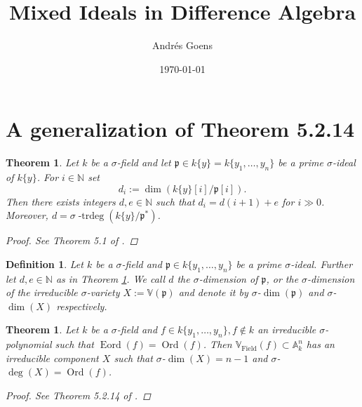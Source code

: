 \documentclass{article}
\title{Mixed Ideals in Difference Algebra}
\author{Andr\'{e}s Goens}
\date{\today}
\def\N{\mathbb{N}}
\def\VV{\mathbb{V}}
\def\p{\mathfrak{p}}
\def\s{\sigma}
\def\dim{\operatorname{dim}}
\newenvironment{bew}{\begin{proof}[Proof]}{\end{proof}}
\theoremstyle{plain}
\newtheorem{theorem}[Satz]{Theorem}
\newtheorem{defn}[Satz]{Definition}
\theoremstyle{definition}
\begin{document}
\setlength{\parindent}{1.5em}
\section{A generalization of Theorem 5.2.14}
\begin{theorem}\label{di=d(i+1)+e}
Let $k$ be a $\s$-field and let $\p \in k\{y\} = k\{y_1,\ldots,y_n\}$ be a prime $\s$-ideal of $k\{y\}$. For $i \in \N$ set $$d_i := \dim(k\{y\}[i]/\p[i]).$$
Then there exists integers $d, e \in \N$ such that $d_i = d(i+1) + e$ for $i \gg 0$. Moreover, $d = \s\operatorname{-trdeg}(k\{y\}/\p^*)$.
\begin{bew}
See Theorem 5.1 of \cite{wibmer}.
\end{bew}
\end{theorem}

\begin{defn}
Let $k$ be a $\s$-field and $\p \in k\{y_1,\ldots,y_n\}$ be a prime $\s$-ideal. Further let $d, e \in \N$ as in Theorem \ref{di=d(i+1)+e}. We call $d$ the $\s$-dimension of $\p$, 
or the $\s$-dimension of the irreducible $\s$-variety $X:= \VV(\p)$ and denote it by $\s$-$\dim(\p)$ and $\s$-$\dim(X)$ respectively.
\end{defn}

\begin{theorem}\label{irredcomp}
Let $k$ be a $\s$-field and $f \in k\{y_1,\ldots,y_n\}, f \notin k$ an irreducible $\s$-polynomial such that $\operatorname{Eord}(f) = \operatorname{Ord}(f)$. Then $\VV_{\operatorname{Field}}(f) \subset \mathbb{A}_k^n$ has an irreducible component $X$ such that $\s$-$\dim(X) = n-1$ and $\s$-$\operatorname{deg}(X) = \operatorname{Ord}(f)$.
\begin{bew}
See Theorem 5.2.14 of \cite{wibmer}.
\end{bew}
\end{theorem}
\end{document}
